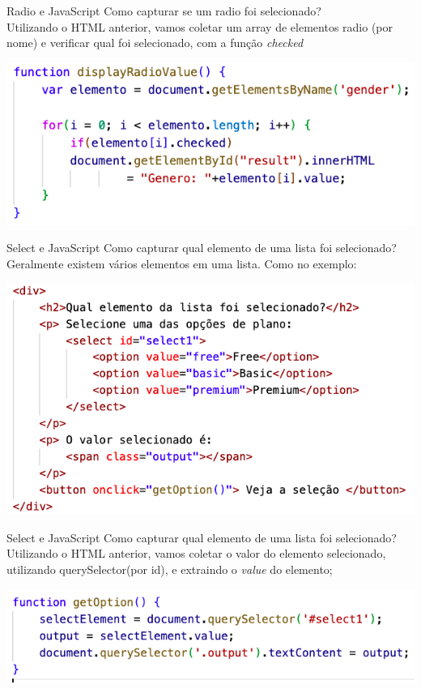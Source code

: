 \documentclass{beamer}
\begin{document}
\begin{frame}{Radio e JavaScript}
Como capturar se um radio foi selecionado?\\
Utilizando o HTML anterior, vamos coletar um array de elementos radio (por nome) e verificar qual foi selecionado, com a função \textit{checked}
\begin{center}
    \includegraphics[height=0.4\paperheight]{fig/aula7/aula7_2.png}
\end{center}

\end{frame}
\begin{frame}{Select e JavaScript}
Como capturar qual elemento de uma lista foi selecionado?\\
Geralmente existem vários elementos em uma lista. Como no exemplo:
\begin{center}
    \includegraphics[height=0.5\paperheight]{fig/aula7/aula7_3.png}
\end{center}

\end{frame}
\begin{frame}{Select e JavaScript}
Como capturar qual elemento de uma lista foi selecionado?\\
Utilizando o HTML anterior, vamos coletar o valor do elemento selecionado, utilizando querySelector(por id), e extraindo o \textit{value} do elemento;
\begin{center}
    \includegraphics[height=0.25\paperheight]{fig/aula7/aula7_4.png}
\end{center}

\end{frame}
\end{document}
